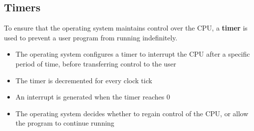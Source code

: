 \documentclass{article}
\begin{document}
\subsection{Timers}
To ensure that the operating system maintains control over the CPU, a \textbf{timer} is used to prevent a user program from running indefinitely.
\begin{itemize}
    \item The operating system configures a timer to interrupt the CPU after a specific period of time, before transferring control to the user
    \item The timer is decremented for every clock tick
    \item An interrupt is generated when the timer reaches 0
    \item The operating system decides whether to regain control of the CPU, or allow the program to continue running
\end{itemize}
\end{document}
